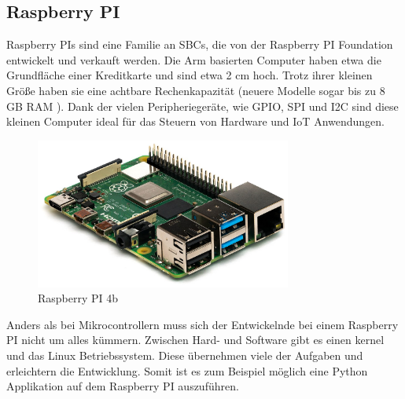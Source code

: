 ﻿\subsection{Raspberry PI}
\label{sec:raspberry_pi}

Raspberry PIs sind eine Familie an \acp{SBC}, die von der Raspberry PI Foundation entwickelt und verkauft werden. Die \ac{Arm} basierten Computer haben etwa die Grundfläche einer Kreditkarte und sind etwa 2 cm hoch. Trotz ihrer kleinen Größe haben sie eine achtbare Rechenkapazität (neuere Modelle sogar bis zu 8 GB \ac{RAM} ). Dank der vielen Peripheriegeräte, wie \ac{GPIO}, \ac{SPI} und \ac{I2C} sind diese kleinen Computer ideal für das Steuern von Hardware und \ac{IoT} Anwendungen.

\begin{figure}[H]
  \centering
  \includegraphics[width=0.75\textwidth]{images/raspberry_pi_4b}
  \caption{Raspberry PI 4b }
  \label{fig:raspberry_pi_4b}
\end{figure}

Anders als bei Mikrocontrollern muss sich der Entwickelnde bei einem Raspberry PI nicht um alles kümmern. Zwischen Hard- und Software gibt es einen \Gls{kernel} und das Linux Betriebssystem. Diese übernehmen viele der Aufgaben und erleichtern die Entwicklung. Somit ist es zum Beispiel möglich eine Python Applikation auf dem Raspberry PI auszuführen.
